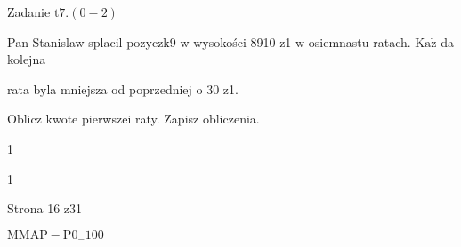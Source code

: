 \documentclass[a4paper,12pt]{article}
\begin{document}
Zadanie $\mathrm{t}7. (0-2)$

Pan Stanislaw splacil pozyczk9 w wysokości 8910 z1 w osiemnastu ratach. $\mathrm{K}\mathrm{a}\dot{\mathrm{z}}$ da kolejna

rata byla mniejsza od poprzedniej o 30 z1.

Oblicz kwote pierwszei raty. Zapisz obliczenia.

1

1

Strona 16 z31

$\mathrm{M}\mathrm{M}\mathrm{A}\mathrm{P}-\mathrm{P}0_{-}100$
\end{document}
